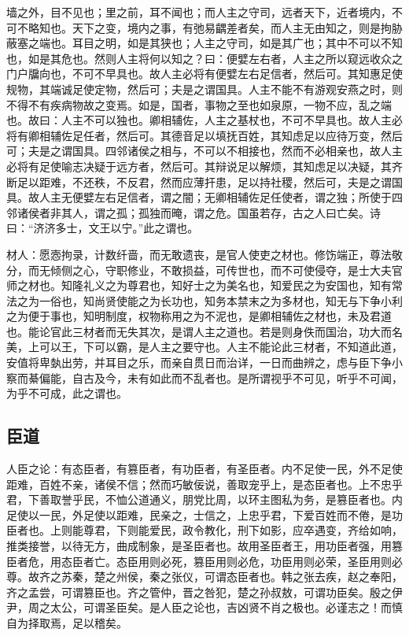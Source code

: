 \documentclass[]{article}
\begin{document}
墙之外，目不见也；里之前，耳不闻也；而人主之守司，远者天下，近者境内，不可不略知也。天下之变，境内之事，有弛易齵差者矣，而人主无由知之，则是拘胁蔽塞之端也。耳目之明，如是其狭也；人主之守司，如是其广也；其中不可以不知也，如是其危也。然则人主将何以知之？曰：便嬖左右者，人主之所以窥远收众之门户牖向也，不可不早具也。故人主必将有便嬖左右足信者，然后可。其知惠足使规物，其端诚足使定物，然后可；夫是之谓国具。人主不能不有游观安燕之时，则不得不有疾病物故之变焉。如是，国者，事物之至也如泉原，一物不应，乱之端也。故曰：人主不可以独也。卿相辅佐，人主之基杖也，不可不早具也。故人主必将有卿相辅佐足任者，然后可。其德音足以填抚百姓，其知虑足以应待万变，然后可；夫是之谓国具。四邻诸侯之相与，不可以不相接也，然而不必相亲也，故人主必将有足使喻志决疑于远方者，然后可。其辩说足以解烦，其知虑足以决疑，其齐断足以距难，不还秩，不反君，然而应薄扞患，足以持社稷，然后可，夫是之谓国具。故人主无便嬖左右足信者，谓之闇；无卿相辅佐足任使者，谓之独；所使于四邻诸侯者非其人，谓之孤；孤独而晻，谓之危。国虽若存，古之人曰亡矣。诗曰：``济济多士，文王以宁。''此之谓也。

材人：愿悫拘录，计数纤啬，而无敢遗丧，是官人使吏之材也。修饬端正，尊法敬分，而无倾侧之心，守职修业，不敢损益，可传世也，而不可使侵夺，是士大夫官师之材也。知隆礼义之为尊君也，知好士之为美名也，知爱民之为安国也，知有常法之为一俗也，知尚贤使能之为长功也，知务本禁末之为多材也，知无与下争小利之为便于事也，知明制度，权物称用之为不泥也，是卿相辅佐之材也，未及君道也。能论官此三材者而无失其次，是谓人主之道也。若是则身佚而国治，功大而名美，上可以王，下可以霸，是人主之要守也。人主不能论此三材者，不知道此道，安值将卑埶出劳，并耳目之乐，而亲自贯日而治详，一日而曲辨之，虑与臣下争小察而綦偏能，自古及今，未有如此而不乱者也。是所谓视乎不可见，听乎不可闻，为乎不可成，此之谓也。

\hypertarget{header-n60}{%
\subsection{臣道}\label{header-n60}}

人臣之论：有态臣者，有篡臣者，有功臣者，有圣臣者。内不足使一民，外不足使距难，百姓不亲，诸侯不信；然而巧敏佞说，善取宠乎上，是态臣者也。上不忠乎君，下善取誉乎民，不恤公道通义，朋党比周，以环主图私为务，是篡臣者也。内足使以一民，外足使以距难，民亲之，士信之，上忠乎君，下爱百姓而不倦，是功臣者也。上则能尊君，下则能爱民，政令教化，刑下如影，应卒遇变，齐给如响，推类接誉，以待无方，曲成制象，是圣臣者也。故用圣臣者王，用功臣者强，用篡臣者危，用态臣者亡。态臣用则必死，篡臣用则必危，功臣用则必荣，圣臣用则必尊。故齐之苏秦，楚之州侯，秦之张仪，可谓态臣者也。韩之张去疾，赵之奉阳，齐之孟尝，可谓篡臣也。齐之管仲，晋之咎犯，楚之孙叔敖，可谓功臣矣。殷之伊尹，周之太公，可谓圣臣矣。是人臣之论也，吉凶贤不肖之极也。必谨志之！而慎自为择取焉，足以稽矣。
\end{document}
